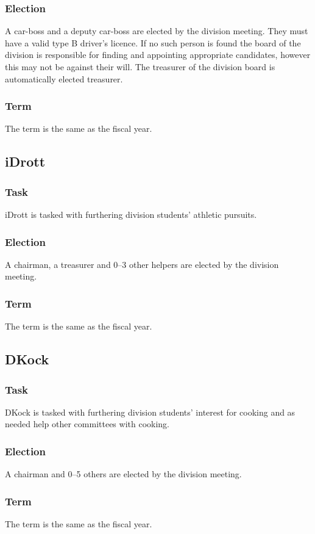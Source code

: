 \subsubsection{Election}
A car-boss and a deputy car-boss are elected by the division meeting. They must have a valid type B driver's licence. If no such person is found the board of the division is responsible for finding and appointing appropriate candidates, however this may not be against their will. The treasurer of the division board is automatically elected treasurer.

\subsubsection{Term}
The term is the same as the fiscal year. 

\subsection{iDrott}

\subsubsection{Task}
iDrott is tasked with furthering division students' athletic pursuits. 

\subsubsection{Election}
A chairman, a treasurer and 0--3 other helpers are elected by the division meeting. 

\subsubsection{Term}
The term is the same as the fiscal year. 

\subsection{DKock}

\subsubsection{Task}
DKock is tasked with furthering division students' interest for cooking and as needed help other committees with cooking.

\subsubsection{Election}
A chairman and 0--5 others are elected by the division meeting. 

\subsubsection{Term}
The term is the same as the fiscal year. 


\newpage
